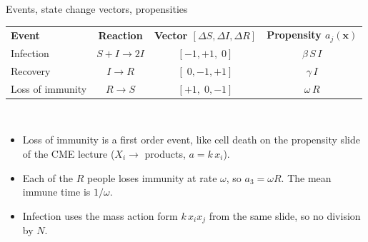 \documentclass[aspectratio=141,10pt]{beamer}
\begin{document}
\begin{frame}{Events, state change vectors, propensities}
\centering
\renewcommand{\arraystretch}{1.6}
\begin{tabular}{l c c c}
\rowcolor{aimsred}\color{white}\bfseries Event & \color{white}\bfseries Reaction & \color{white}\bfseries Vector $[\Delta S,\Delta I,\Delta R]$ & \color{white}\bfseries Propensity $a_j(\mathbf x)$\\
Infection & $S+I\to 2I$ & $[-1,+1,\;0]$ & $\beta\,S\,I$\\
\rowcolor{rowpink} Recovery & $I\to R$ & $[\;0,-1,+1]$ & $\gamma\,I$\\
Loss of immunity & $R\to S$ & $[+1,\;0,-1]$ & $\omega\,R$\\
\end{tabular}
\\[1.4em]
\raggedright
\begin{itemize}\setlength\itemsep{0.9em}
  \item Loss of immunity is a first order event, like cell death on the propensity slide of the CME lecture ($X_i\to$ products, $a=k\,x_i$).
  \item Each of the $R$ people loses immunity at rate $\omega$, so $a_3=\omega R$. The mean immune time is $1/\omega$.
  \item Infection uses the mass action form $k\,x_ix_j$ from the same slide, so no division by $N$.
\end{itemize}
\end{frame}
\end{document}
